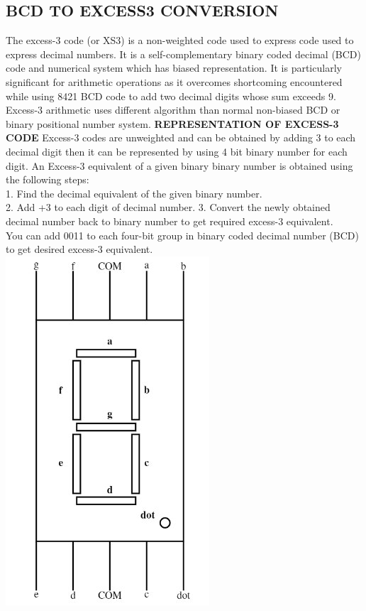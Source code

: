 \documentclass{article}
\begin{document}
\begin{tableofcontents}
\section{BCD TO EXCESS3 CONVERSION}
The excess-3 code (or XS3) is a non-weighted code used to express code used to express decimal numbers. It is a self-complementary binary coded decimal (BCD) code and numerical system which has biased representation. It is particularly significant for arithmetic operations as it overcomes shortcoming encountered while using 8421 BCD code to add two decimal digits whose sum exceeds 9. Excess-3 arithmetic uses different algorithm than normal non-biased BCD or binary positional number system.
\textbf{REPRESENTATION OF EXCESS-3 CODE}
Excess-3 codes are unweighted and can be obtained by adding 3 to each decimal digit then it can be represented by using 4 bit binary number for each digit. An Excess-3 equivalent of a given binary binary number is obtained using the following steps:
\\
1. Find the decimal equivalent of the given binary number.
\\
2. Add +3 to each digit of decimal number.
3. Convert the newly obtained decimal number back to binary number to get required excess-3 equivalent.
\newline
\\
   You can add 0011 to each four-bit group in binary coded decimal number (BCD) to get desired excess-3 equivalent.
\newline
\newline
\\
\includegraphics[scale=0.5]{7seg.jpg}

\end{tableofcontents}
\end{document}

